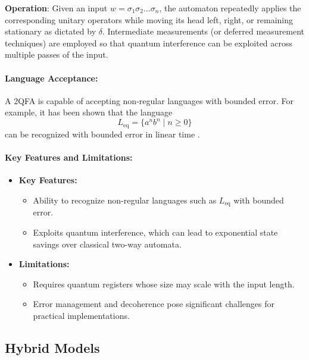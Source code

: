 \textbf{Operation}:  
Given an input \( w = \sigma_1\sigma_2\ldots\sigma_n \), the automaton repeatedly applies the corresponding unitary operators while moving its head left, right, or remaining stationary as dictated by \(\delta\). Intermediate measurements (or deferred measurement techniques) are employed so that quantum interference can be exploited across multiple passes of the input.

\paragraph{Language Acceptance:}  
A 2QFA is capable of accepting non-regular languages with bounded error. For example, it has been shown that the language 
\[
L_{\text{eq}} = \{a^n b^n \mid n \geq 0\}
\]
can be recognized with bounded error in linear time \cite{kondacs1997power, yakaryilmaz2010succinctness}.

\paragraph{Key Features and Limitations:}
\begin{itemize}
    \item \textbf{Key Features:}
    \begin{itemize}
        \item Ability to recognize non-regular languages such as \( L_{\text{eq}} \) with bounded error.
        \item Exploits quantum interference, which can lead to exponential state savings over classical two-way automata.
    \end{itemize}
    \item \textbf{Limitations:}
    \begin{itemize}
        \item Requires quantum registers whose size may scale with the input length.
        \item Error management and decoherence pose significant challenges for practical implementations.
    \end{itemize}
\end{itemize}

\subsection{Hybrid Models}
\label{subsec:two-way-hybrid}

